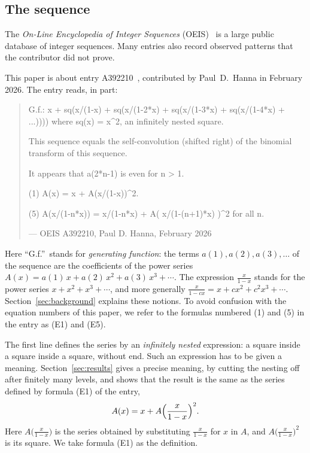 \documentclass[11pt,a4paper]{article}
\theoremstyle{definition}
\theoremstyle{remark}
\begin{document}
\subsection{The sequence}\label{sec:sequence}
The \emph{On-Line Encyclopedia of Integer Sequences} (OEIS)~\cite{oeisdb} is a large public database of integer
sequences. Many
entries also record observed patterns that the contributor did not prove.

This paper is about entry A392210~\cite{oeis}, contributed by Paul~D.~Hanna in February 2026. The entry reads, in part:
\begin{quote}\small\ttfamily\raggedright G.f.: x + sq(x/(1-x) + sq(x/(1-2*x) + sq(x/(1-3*x) + sq(x/(1-4*x) + ...)))) where sq(x) = x\^{}2, an infinitely nested square.\par\smallskip This sequence equals the self-convolution (shifted right) of the binomial transform of this sequence.\par\smallskip It appears that a(2*n-1) is even for n > 1.\par\smallskip (1) A(x) = x + A(x/(1-x))\^{}2.\par\smallskip (5) A(x/(1-n*x)) = x/(1-n*x) + A( x/(1-(n+1)*x) )\^{}2 for all n.\par\smallskip\hfill\textrm{--- OEIS A392210, Paul D. Hanna, February 2026}\end{quote}

Here ``G.f.''\ stands for \emph{generating function}: the terms $a(1),a(2),a(3),\dots$ of the sequence are the
coefficients of the power series $A(x)=a(1)\,x+a(2)\,x^2+a(3)\,x^3+\cdots$. The expression $\frac{x}{1-x}$ stands for
the power series $x+x^2+x^3+\cdots$, and more generally $\frac{x}{1-cx}=x+cx^2+c^2x^3+\cdots$.
Section~\ref{sec:background} explains these notions. To avoid confusion with the equation numbers of this paper,
we refer to the formulas numbered (1) and (5) in the entry as (E1) and (E5).

The first line defines the series by an \emph{infinitely nested} expression: a square inside a square inside a square,
without end. Such an expression has to be given a meaning. Section~\ref{sec:results} gives a precise meaning, by
cutting the nesting off after finitely many levels, and shows that the result is the same as the series defined by
formula (E1) of the entry,
\[
A(x)=x+A\Bigl(\frac{x}{1-x}\Bigr)^2 .
\]
Here $A\bigl(\frac{x}{1-x}\bigr)$ is the series obtained by substituting $\frac{x}{1-x}$ for $x$ in $A$, and
$A\bigl(\frac{x}{1-x}\bigr)^2$ is its square. We take formula (E1) as the definition.
\end{document}
